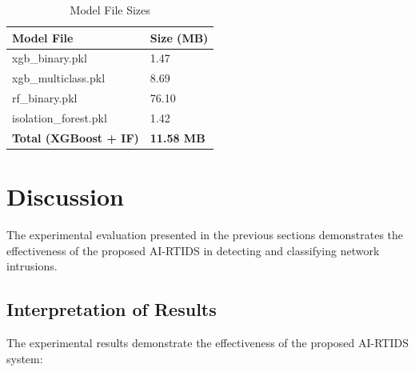\documentclass[12pt,a4paper]{report}
\begin{document}
\begin{table}[htbp]
\centering
\caption{Model File Sizes}
\label{tab:model_sizes}
\renewcommand{\arraystretch}{1.3}
\begin{tabularx}{\textwidth}{|p{5.5cm}|p{4.0cm}|}
\hline
\textbf{Model File} & \textbf{Size (MB)} \\
\hline
xgb\_binary.pkl & 1.47 \\
\hline
xgb\_multiclass.pkl & 8.69 \\
\hline
rf\_binary.pkl & 76.10 \\
\hline
isolation\_forest.pkl & 1.42 \\
\hline
\textbf{Total (XGBoost + IF)} & \textbf{11.58 MB} \\
\hline
\end{tabularx}
\end{table}

\section{Discussion}

The experimental evaluation presented in the previous sections demonstrates the effectiveness of the proposed AI-RTIDS in detecting and classifying network intrusions.

\subsection{Interpretation of Results}

The experimental results demonstrate the effectiveness of the proposed AI-RTIDS system:
\end{document}
